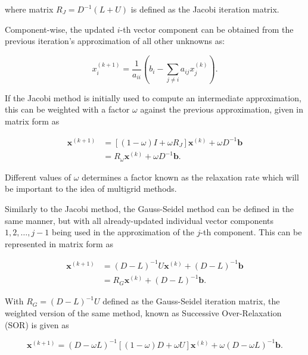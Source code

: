 where matrix $R_J = D^{-1}(L + U)$ is defined as the Jacobi iteration matrix.

Component-wise, the updated $i$-th vector component can be obtained from the previous iteration's approximation of all other unknowns as:

\begin{equation}
	x_{i}^{(k+1)} = \frac{1}{a_{ii}}\left(b_i- \sum_{j \neq i}{a_{ij}x_{j}^{(k)}} \right).
\end{equation}

If the Jacobi method is initially used to compute an intermediate approximation, this can be weighted with a factor $\omega$ against the previous approximation, given in matrix form as

\begin{equation}
	\begin{aligned}
	\mathbf{x}^{(k+1)} &= \left[ (1-\omega) I + \omega R_J \right] \mathbf{x}^{(k)} + \omega D^{-1}\mathbf{b} \\
	&= R_{\omega}\mathbf{x}^{(k)} + \omega D^{-1} \mathbf{b}.
	\end{aligned}
\end{equation}

Different values of $\omega$ determines a factor known as the relaxation rate which will be important to the idea of multigrid methods.

Similarly to the Jacobi method, the Gauss-Seidel method can be defined in the same manner, but with all already-updated individual vector components $1, 2, \ldots, j - 1$  being used in the approximation of the $j$-th component. This can be represented in matrix form as

\begin{equation}
	\begin{aligned}
	\mathbf{x}^{(k+1)} &= (D-L)^{-1}U\mathbf{x}^{(k)} + (D-L)^{-1}\mathbf{b} \\
                       &= R_G\mathbf{x}^{(k)} + (D-L)^{-1}\mathbf{b}.
	\end{aligned}
\end{equation}

With $R_G = (D-L)^{-1}U$ defined as the Gauss-Seidel iteration matrix, the weighted version of the same method, known as Successive Over-Relaxation (SOR) is given as

\begin{equation}
	\mathbf{x}^{(k+1)} = (D - \omega L)^{-1} \left[(1-\omega)D + \omega U \right]\mathbf{x}^{(k)} + \omega (D - \omega L)^{-1} \mathbf{b}.
\end{equation}

